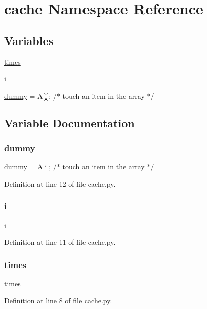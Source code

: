 \hypertarget{namespacecache}{}\section{cache Namespace Reference}
\label{namespacecache}
\subsection*{Variables}
\begin{DoxyCompactItemize}
\item 
\mbox{\hyperlink{namespacecache_ac150111bafc331bafb353619452c5c5c}{times}}
\item 
\mbox{\hyperlink{namespacecache_a7e98b8a17c0aad30ba64d47b74e2a6c1}{i}}
\item 
\mbox{\hyperlink{namespacecache_a2284e85c761030af4607677d8bc8404d}{dummy}} = A\mbox{[}\mbox{\hyperlink{namespacecache_a7e98b8a17c0aad30ba64d47b74e2a6c1}{i}}\mbox{]}; /$\ast$ touch an item in the array $\ast$/
\end{DoxyCompactItemize}


\subsection{Variable Documentation}
\mbox{\label{namespacecache_a2284e85c761030af4607677d8bc8404d}} 
\subsubsection{\texorpdfstring{dummy}{dummy}}
{\footnotesize\ttfamily dummy = A\mbox{[}\mbox{\hyperlink{namespacecache_a7e98b8a17c0aad30ba64d47b74e2a6c1}{i}}\mbox{]}; /$\ast$ touch an item in the array $\ast$/}



Definition at line 12 of file cache.\+py.

\mbox{\label{namespacecache_a7e98b8a17c0aad30ba64d47b74e2a6c1}} 
\subsubsection{\texorpdfstring{i}{i}}
{\footnotesize\ttfamily i}



Definition at line 11 of file cache.\+py.

\mbox{\label{namespacecache_ac150111bafc331bafb353619452c5c5c}} 
\subsubsection{\texorpdfstring{times}{times}}
{\footnotesize\ttfamily times}



Definition at line 8 of file cache.\+py.

